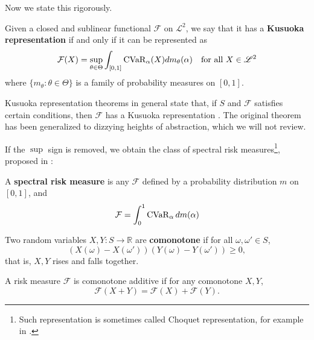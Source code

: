 Now we state this rigorously.

\begin{defn}\label{defn:kusuoka_rep}
Given a closed and sublinear functional \(\mathcal{F}\) on \(\mathscr{L}^2\), we say that it has a \textbf{Kusuoka representation} if and only if it can be represented as 
\begin{equation}
\mathcal{F}(X) = \sup_{\theta\in \Theta} \int_{[0, 1]} \text{\ensuremath{\operatorname{CVaR}}}_\alpha(X) dm_\theta(\alpha) \quad \text{for all }X \in \mathscr{L}^2
\label{eq:kusuoka_rep}
\end{equation}
where \(\{m_\theta : \theta \in \Theta\} \) is a family of probability measures on \([0, 1]\).
\end{defn}

Kusuoka representation theorems in general state that, if \(S\) and \(\mathcal{F}\) satisfies certain conditions, then \(\mathcal{F}\) has a Kusuoka representation \cite[Section 2.2.4]{pflugModelingMeasuringManaging2008}. The original theorem has been generalized to dizzying heights of abstraction, which we will not review.

If the $\sup$ sign is removed, we obtain the class of spectral risk measures\footnote{Such representation is sometimes called Choquet representation, for example in \cite[Definition 2.48]{pflugModelingMeasuringManaging2008}.}, proposed in \cite{acerbiSpectralMeasuresRisk2002}:
\begin{defn}
A \textbf{spectral risk measure} is any $\mathcal{F}$ defined by a probability distribution $m$ on $[0, 1]$, and 
\begin{equation}
\mathcal{F} = \int_0^1 \operatorname{CVaR}_\alpha dm(\alpha)
\end{equation}
\end{defn}

\begin{defn}
	Two random variables $X, Y: S\to \mathbb{R}$ are \textbf{comonotone} if for all $\omega, \omega'\in S$, 
	\begin{equation}
	(X(\omega) - X(\omega'))(Y(\omega) - Y(\omega')) \ge 0,
	\end{equation}
	that is, $X, Y$ rises and falls together.
	
	A risk measure $\mathcal{F}$ is comonotone additive if for any comonotone $X, Y$, 
	\begin{equation}
	\mathcal{F}(X + Y) = \mathcal{F}(X) + \mathcal{F}(Y).
	\end{equation}
\end{defn}

